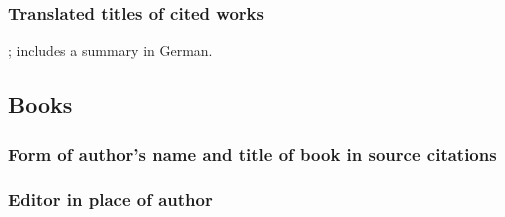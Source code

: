 \documentclass[11pt,letterpaper,oneside]{article}
\begin{document}
\setcounter{subsubsection}{98}
\subsubsection{Translated titles of cited works}

\begin{citebib}
\item \cite{wereszycki1977}; includes a summary in German.
\item \cite[272]{kern1938}
\item \cite{pirumova1977b}
\item \cite{furet1999}
\end{citebib}

\setcounter{subsection}{4}
\subsection{Books}
\setcounter{subsection}{14}

\setcounter{subsubsection}{100}
\subsubsection{Form of author's name and title of book in source citations}

\begin{citebib}
\item \cite[79--80]{gawande2014}
\item \cite[191]{gawande2014}
\end{citebib}

\setcounter{subsubsection}{102}
\subsubsection{Editor in place of author}
\label{14.103}

\begin{citebib}
\item \cite[100]{egan2014}
\item \cite[33]{schechter2011}
\item \cite[34]{silverstein1974}
\item \cite[301--2]{egan2014}
\item \cite[54--56]{schechter2011}
\item \cite[38]{silverstein1974}
\end{citebib}
\end{document}
